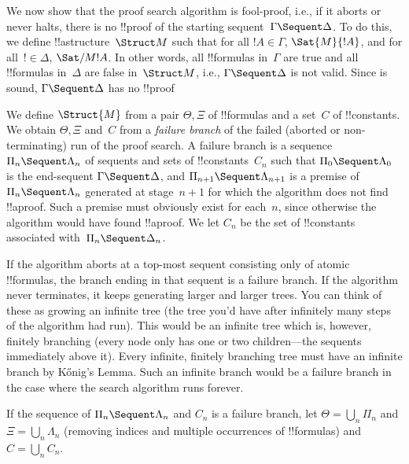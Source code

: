 \documentclass[../../../include/open-logic-section]{subfiles}
\begin{document}


We now show that the proof search algorithm is fool-proof, i.e., if it
aborts or never halts, there is no !!{proof} of the starting
sequent~$\Gamma \Sequent \Delta$. To do this, we define
!!a{structure}~$\Struct M$ such that for all $!A \in \Gamma$,
$\Sat{M}{!A}$, and for all~$! \in \Delta$, $\Sat/{M}{!A}$. In other
words, all !!{formula}s in~$\Gamma$ are true and all !!{formula}s
in~$\Delta$ are false in~$\Struct M$, i.e., $\Gamma \Sequent \Delta$
is not valid. Since  is sound, $\Gamma \Sequent \Delta$ has
no !!{proof}

We define $\Struct{M}$ from a pair $\Theta, \Xi$ of !!{formula}s and a
set~$C$ of !!{constant}s. We obtain $\Theta, \Xi$ and~$C$ from a
\emph{failure branch} of the failed (aborted or non-terminating) run
of the proof search. A failure branch is a sequence $\Pi_n \Sequent
\Lambda_n$ of sequents and sets of !!{constant}s~$C_n$ such that
$\Pi_0 \Sequent \Lambda_0$ is the end-sequent $\Gamma \Sequent
\Delta$, and $\Pi_{n+1} \Sequent \Lambda_{n+1}$ is a premise of $\Pi_n
\Sequent \Lambda_n$ generated at stage~$n+1$ for which the algorithm
does not find !!a{proof}. Such a premise must obviously exist for
each~$n$, since otherwise the algorithm would have found !!a{proof}.
We let $C_n$ be the set of !!{constant}s associated with~$\Pi_n
\Sequent \Delta_n$.

If the algorithm aborts at a top-most sequent consisting only of
atomic !!{formula}s, the branch ending in that sequent is a failure
branch. If the algorithm never terminates, it keeps generating
larger and larger trees. You can think of these as growing an infinite
tree (the tree you'd have after infinitely many steps of the algorithm
had run). This would be an infinite tree which is, however, finitely
branching (every node only has one or two children---the sequents
immediately above it). Every infinite, finitely branching tree must
have an infinite branch by K\H{o}nig's Lemma. Such an infinite branch
would be a failure branch in the case where the search algorithm runs
forever.

If the sequence of $\Pi_n \Sequent \Lambda_n$ and $C_n$ is a failure
branch, let $\Theta = \bigcup_n \Pi_n$ and $\Xi = \bigcup_n \Lambda_n$
(removing indices and multiple occurrences of !!{formula}s) and $C =
\bigcup_n C_n$.
\end{document}
